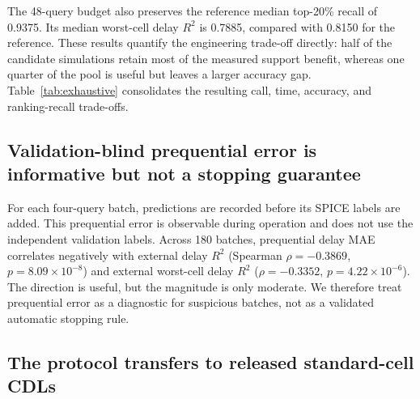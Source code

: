 \documentclass[preprint,12pt]{elsarticle}
\begin{document}
The 48-query budget also preserves the reference median top-20\% recall of 0.9375. Its median worst-cell delay $R^2$ is 0.7885, compared with 0.8150 for the reference. These results quantify the engineering trade-off directly: half of the candidate simulations retain most of the measured support benefit, whereas one quarter of the pool is useful but leaves a larger accuracy gap. Table~\ref{tab:exhaustive} consolidates the resulting call, time, accuracy, and ranking-recall trade-offs.

\begin{table}[t]
\centering
\caption{Online budgets compared with the measured 96-query reference over 15 seed-corner runs.}
\label{tab:exhaustive}
\end{table}

\subsection{Validation-blind prequential error is informative but not a stopping guarantee}

For each four-query batch, predictions are recorded before its SPICE labels are added. This prequential error is observable during operation and does not use the independent validation labels. Across 180 batches, prequential delay MAE correlates negatively with external delay $R^2$ (Spearman $\rho=-0.3869$, $p=8.09\times10^{-8}$) and external worst-cell delay $R^2$ ($\rho=-0.3352$, $p=4.22\times10^{-6}$). The direction is useful, but the magnitude is only moderate. We therefore treat prequential error as a diagnostic for suspicious batches, not as a validated automatic stopping rule.

\subsection{The protocol transfers to released standard-cell CDLs}
\end{document}
